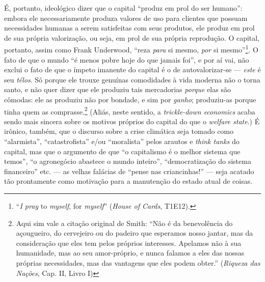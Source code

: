 \documentclass[12pt]{article}
\begin{document}
É, portanto, ideológico dizer que o capital ``produz em prol do ser humano'': embora ele necessariamente produza valores de uso para clientes que possuam necessidades humanas a serem satisfeitas com seus produtos, ele produz em prol de sua própria valorização, ou seja, em prol de sua própria reprodução. O capital, portanto, assim como Frank Underwood, ``reza \textit{para} si mesmo, \textit{por} si mesmo''\footnote{``\textit{I pray} to \textit{myself}, for \textit{myself}'' (\textit{House of Cards}, T1E12).}. O fato de que o mundo ``é menos pobre hoje do que jamais foi'', e por aí vai, não exclui o fato de que o ímpeto imanente do capital é o de autovalorizar-se --- \textit{este} é seu \textit{télos}. Só porque ele trouxe genuínas comodidades à vida moderna não o torna santo, e não quer dizer que ele produziu tais mercadorias \textit{porque} elas são cômodas: ele as produziu não por bondade, e sim por \textit{ganho}; produziu-as porque tinha quem as comprasse.\footnote{Aqui sim vale a citação original de Smith: ``Não é da benevolência do açougueiro, do cervejeiro ou do padeiro que esperamos nosso jantar, mas da consideração que eles tem pelos próprios interesses. Apelamos não à sua humanidade, mas ao seu amor-próprio, e nunca falamos a eles das nossas próprias necessidades, mas das vantagens que eles podem obter.'' (\textit{Riqueza das Nações}, Cap. II, Livro I)} (Aliás, neste sentido, a \textit{trickle-down economics} acaba sendo mais sincera sobre os motivos próprios do capital do que o \textit{welfare state}.) É irônico, também, que o discurso sobre a crise climática seja tomado como ``alarmista'', ``catastrofista'' e/ou ``moralista'' pelos arautos e \textit{think tanks} do capital, mas que o argumento de que ``o capitalismo é o melhor sistema que temos'', ``o agronegócio abastece o mundo inteiro'', ``democratização do sistema financeiro'' etc. --- as velhas falácias de ``pense nas criancinhas!'' --- seja acatado tão prontamente como motivação para a manutenção do estado atual de coisas.
\end{document}
